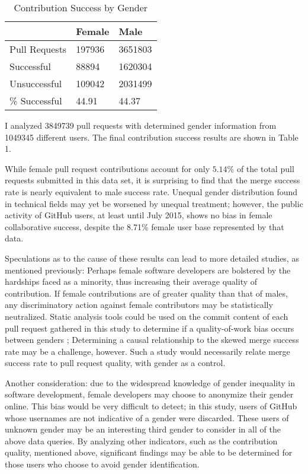 \documentclass[authoryear]{sigplanconf}
\begin{document}
\begin{table}[h]
  \begin{center}
    \caption{Contribution Success by Gender}
    \begin{tabular}{l|l|l}
      & Female & Male\\ \hline
      Pull Requests & \num{197936} & \num{3651803} \\ \hline
      Successful  & \num{88894} & \num{1620304} \\ \hline
      Unsuccessful  & \num{109042} & \num{2031499} \\ \hline
      \% Successful & \num{44.91} & \num{44.37} \\ \hline
    \end{tabular}
  \end{center}
\end{table}

I analyzed \num{3849739} pull requests with determined gender information from
\num{1049345} different users. The final contribution success results are shown in Table 1.

While female pull request contributions account for only $5.14\%$ of the total pull
requests submitted in this data set, it is surprising to find that the merge
success rate is nearly equivalent to male success rate. Unequal gender
distribution found in technical fields may yet be worsened by unequal treatment;
however, the public activity of GitHub users, at least until July 2015,
shows no bias in female collaborative success, despite the 8.71\% female
user base represented by that data.

Speculations as to the cause of these results can lead to more detailed studies,
as mentioned previously:
Perhaps female software developers are bolstered by the hardships faced as a
minority, thus increasing their average quality of contribution. If female
contributions are of greater quality than that of males, any discriminatory
action against female contributors may be statistically neutralized. Static
analysis tools could be used on the commit content of each pull request gathered
in this study to determine if a quality-of-work bias occurs between genders
\cite{staticanalysis}; Determining a causal relationship to the skewed merge success rate may be a
challenge, however. Such a study would necessarily relate merge success rate to
pull request quality, with gender as a control.

Another consideration: due to the widespread knowledge of gender inequality in software development,
female developers may choose to anonymize their gender online. This bias would
be very difficult to detect; in this study, users of GitHub whose usernames are
not indicative of a gender were discarded. These users of unknown gender may be
an interesting third gender to consider in all of the above data queries. By
analyzing other indicators, such as the contribution quality, mentioned above,
significant findings may be able to be determined for those users who choose to
avoid gender identification.
\end{document}
